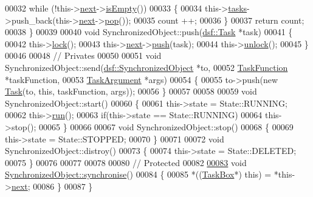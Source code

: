 \begin{DoxyCode}
00032         \textcolor{keywordflow}{while} (!this->\hyperlink{classdsf_1_1_synchronisable_ae2434faac15d3184da1543a91e175713}{next}->\hyperlink{classdsf_1_1_task_box_a7e67fd9b7104d24cb4be54f6a48eb8c9}{isEmpty}())
00033         \{
00034             this->\hyperlink{classdsf_1_1_task_box_ae13d0d245cacbf7f4019f7ff5486aa79}{tasks}->push\_back(this->\hyperlink{classdsf_1_1_synchronisable_ae2434faac15d3184da1543a91e175713}{next}->\hyperlink{classdsf_1_1_task_box_a4dd2eb0544472b8250037d0014ad71f4}{pop}());
00035             count ++;
00036         \}
00037         \textcolor{keywordflow}{return} count;
00038     \}
00039     
00040     \textcolor{keywordtype}{void} SynchronizedObject::push(\hyperlink{classdsf_1_1_task}{dsf::Task} *task)
00041     \{
00042         this->\hyperlink{classdsf_1_1_lock_ae521388d861fe66b9c6e2f09811b0d4b}{lock}();
00043         this->\hyperlink{classdsf_1_1_synchronisable_ae2434faac15d3184da1543a91e175713}{next}->\hyperlink{classdsf_1_1_task_box_a0ec4e52a625fae00e05b072d6434eef1}{push}(task);
00044         this->\hyperlink{classdsf_1_1_lock_a3d03f801920d458b3c3c402a0f4af323}{unlock}();
00045     \}
00046     
00048     \textcolor{comment}{// Privates}
00050 \textcolor{comment}{}    
00051     \textcolor{keywordtype}{void} SynchronizedObject::send(\hyperlink{classdsf_1_1_synchronized_object}{dsf::SynchronizedObject} *to,
00052                                 \hyperlink{namespacedsf_aa16e735f29587f4485b56fc46746f7a9}{TaskFunction} *taskFunction,
00053                                 \hyperlink{namespacedsf_abe4bf68433935a81c31a5ada9b17663a}{TaskArgument} *args)
00054     \{
00055         to->push(\textcolor{keyword}{new} \hyperlink{namespacedsf_a7df24c7d3d82e2e686aa3a524dc1dee9}{Task}(to, \textcolor{keyword}{this}, taskFunction, args));
00056     \}
00057     
00058     
00059     \textcolor{keywordtype}{void} SynchronizedObject::start()
00060     \{
00061         this->state = State::RUNNING;
00062         this->\hyperlink{classdsf_1_1_synchronized_object_ae94875bd63d8071f8a563ac45ca7ccc2}{run}();
00063         \textcolor{keywordflow}{if}(this->state == State::RUNNING)
00064             this->stop();
00065     \}
00066     
00067     \textcolor{keywordtype}{void} SynchronizedObject::stop()
00068     \{
00069         this->state = State::STOPPED;
00070     \}
00071     
00072     \textcolor{keywordtype}{void} SynchronizedObject::distroy()
00073     \{
00074         this->state = State::DELETED;
00075     \}
00076     
00077     
00078     
00080     \textcolor{comment}{// Protected}
00082 \textcolor{comment}{}    
\hypertarget{_synchronized_object_8cpp_source_l00083}{}\hyperlink{classdsf_1_1_synchronized_object_a4e200d7b3508db98f09c6fe547f46cdb}{00083}     \textcolor{keywordtype}{void} \hyperlink{classdsf_1_1_synchronized_object_a4e200d7b3508db98f09c6fe547f46cdb}{SynchronizedObject::synchronise}()
00084     \{
00085         *((\hyperlink{classdsf_1_1_task_box}{TaskBox}*) \textcolor{keyword}{this}) = *this->\hyperlink{classdsf_1_1_synchronisable_ae2434faac15d3184da1543a91e175713}{next};
00086     \}
00087 \}
\end{DoxyCode}
